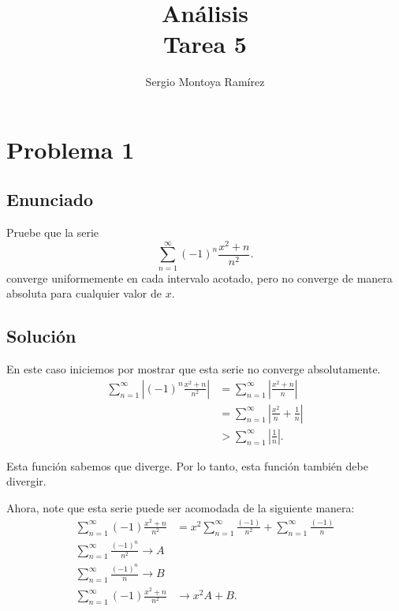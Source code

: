 \documentclass{report}
\title{\Huge{Análisis}\\Tarea 5}
\author{\huge{Sergio Montoya Ramírez}}
\date{}
\begin{document}
\maketitle
\newpage%
\tableofcontents
\pagebreak

\chapter{Problema 1}
\section{Enunciado}

Pruebe que la serie \[
\displaystyle \sum_{n=1}^{\infty} \left( -1 \right)^{n}\frac{x^2 + n}{n^2}
.\] converge uniformemente en cada intervalo acotado, pero no converge de manera absoluta para cualquier valor de $x$.

\section{Solución}

En este caso iniciemos por mostrar que esta serie no converge absolutamente.
\begin{align*}
  \sum_{n=1}^{\infty} \left| \left( -1 \right)^{n} \frac{x^2 + n}{n^2} \right| &= \sum_{n=1}^{\infty} \left| \frac{x^2 + n}{n} \right|  \\
  &= \sum_{n=1}^{\infty} \left| \frac{x^2}{n} + \frac{1}{n} \right|  \\
  &> \sum_{n=1}^{\infty} \left| \frac{1}{n} \right|
.\end{align*}

Esta función sabemos que diverge. Por lo tanto, esta función también debe divergir.

Ahora, note que esta serie puede ser acomodada de la siguiente manera:
\begin{align*}
  \sum_{n=1}^{\infty} \left( -1 \right) \frac{x^2 + n}{n^2} &= x^2 \sum_{n=1}^{\infty} \frac{\left( -1 \right) }{n^2} + \sum_{n=1}^{\infty} \frac{\left( -1 \right) }{n} \\
  \sum_{n=1}^{\infty} \frac{\left( -1 \right)^{n}}{n^2} \to A\\
  \sum_{n=1}^{\infty} \frac{\left( -1 \right)^{n}}{n} \to B\\
  \sum_{n=1}^{\infty} \left( -1 \right) \frac{x^2 + n}{n^2} &\to x^2A + B
.\end{align*}
\end{document}
